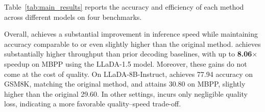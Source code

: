
Table~\ref{tab:main_results} reports the accuracy and efficiency of each method across different models on four benchmarks.

Overall, \dawn{} achieves a substantial improvement in inference speed while maintaining accuracy comparable to or even slightly higher than the original method. \dawn{} achieves substantially higher throughput than prior decoding baselines, with up to \textbf{8.06$\times$} speedup on MBPP using the LLaDA-1.5 model. Moreover, these gains do not come at the cost of quality. On LLaDA-8B-Instruct, \dawn{} achieves 77.94 accuracy on GSM8K, matching the original method, and attains 30.80 on MBPP, slightly higher than the original 29.60. In other settings, \dawn{} incurs only negligible quality loss, indicating a more favorable quality--speed trade-off. 

